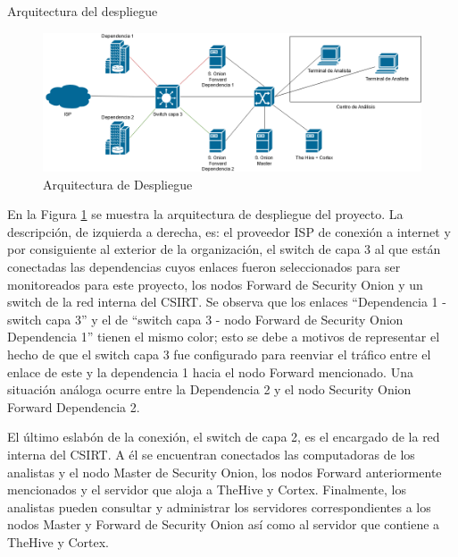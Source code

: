    \begin{section}{Arquitectura del despliegue }
    \begin{figure}[H]
        \centering
        \includegraphics[width=1\textwidth]{./iteracion_1_imagenes/figura_33_arquitectura_despliegue_proyecto.png}
        \caption{Arquitectura de Despliegue}
        \label{fig:arquitectura_despliegue_proyecto}
    \end{figure}
    \FloatBarrier
    En la Figura \ref{fig:arquitectura_despliegue_proyecto} se muestra la arquitectura de despliegue del proyecto. La descripción, de izquierda a derecha, es: el proveedor ISP de conexión a internet y por consiguiente al exterior de la organización, el switch de capa 3 al que están conectadas las dependencias cuyos enlaces fueron seleccionados para ser monitoreados para este proyecto, los nodos Forward de Security Onion y un switch de la red interna del CSIRT. Se observa que los enlaces “Dependencia 1 - switch capa 3” y el de “switch capa 3 - nodo Forward de Security Onion Dependencia 1” tienen el mismo color; esto se debe a motivos de representar el hecho de que el switch capa 3 fue configurado para reenviar el tráfico entre el enlace de este y la dependencia 1 hacia el nodo Forward mencionado. Una situación análoga ocurre entre la Dependencia 2 y el nodo Security Onion Forward Dependencia 2. \par
    El último eslabón de la conexión, el switch de capa 2, es el encargado de la red interna del CSIRT. A él se encuentran conectados las computadoras de los analistas y el nodo Master de Security Onion, los nodos Forward anteriormente mencionados y el servidor que aloja a TheHive y Cortex. Finalmente, los analistas pueden consultar y administrar los servidores correspondientes a los nodos Master y Forward de Security Onion así como al servidor que contiene a TheHive y Cortex. \par

   \end{section}
